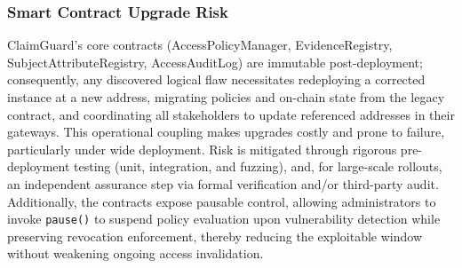 \documentclass[final,5p,times,twocolumn]{elsarticle}
\begin{document}

\subsubsection{Smart Contract Upgrade Risk}
ClaimGuard's core contracts (AccessPolicyManager, EvidenceRegistry, SubjectAttributeRegistry, AccessAuditLog) are immutable post-deployment; consequently, any discovered logical flaw necessitates redeploying a corrected instance at a new address, migrating policies and on-chain state from the legacy contract, and coordinating all stakeholders to update referenced addresses in their gateways. This operational coupling makes upgrades costly and prone to failure, particularly under wide deployment. Risk is mitigated through rigorous pre-deployment testing (unit, integration, and fuzzing), and, for large-scale rollouts, an independent assurance step via formal verification and/or third-party audit. Additionally, the contracts expose pausable control, allowing administrators to invoke \texttt{pause()} to suspend policy evaluation upon vulnerability detection while preserving revocation enforcement, thereby reducing the exploitable window without weakening ongoing access invalidation.


\end{document}

